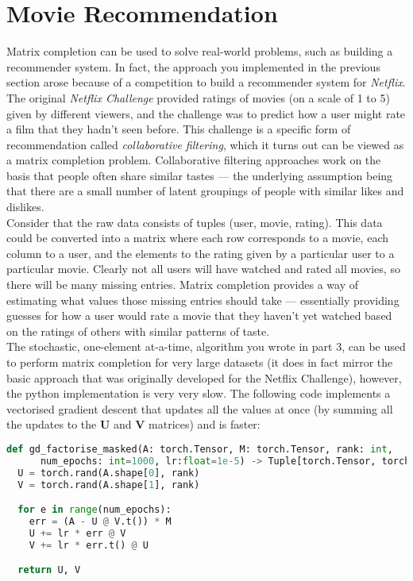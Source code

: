 \documentclass[a4paper]{article}
\begin{document}
\section{Movie Recommendation}
Matrix completion can be used to solve real-world problems, such as building a recommender system. In fact, the approach you implemented in the previous section arose because of a competition to build a recommender system for \emph{Netflix}. The original \emph{Netflix Challenge} provided ratings of movies (on a scale of 1 to 5) given by different viewers, and the challenge was to predict how a user might rate a film that they hadn't seen before. This challenge is a specific form of recommendation called \emph{collaborative filtering}, which it turns out can be viewed as a matrix completion problem. Collaborative filtering approaches work on the basis that people often share similar tastes --- the underlying assumption being that there are a small number of latent groupings of people with similar likes and dislikes.
\\[1em]
Consider that the raw data consists of tuples (user, movie, rating). This data could be converted into a matrix where each row corresponds to a movie, each column to a user, and the elements to the rating given by a particular user to a particular movie. Clearly not all users will have watched and rated all movies, so there will be many missing entries. Matrix completion provides a way of estimating what values those missing entries should take --- essentially providing guesses for how a user would rate a movie that they haven't yet watched based on the ratings of others with similar patterns of taste.
\\[1em]
The stochastic, one-element at-a-time, algorithm you wrote in part 3, can be used to perform matrix completion for very large datasets (it does in fact mirror the basic approach that was originally developed for the Netflix Challenge), however, the python implementation is very very slow. The following code implements a vectorised gradient descent that updates all the values at once (by summing all the updates to the $\bm U$ and $\bm V$ matrices) and is faster:

\begin{lstlisting}[language=Python]
def gd_factorise_masked(A: torch.Tensor, M: torch.Tensor, rank: int, 
      num_epochs: int=1000, lr:float=1e-5) -> Tuple[torch.Tensor, torch.Tensor]:
  U = torch.rand(A.shape[0], rank)
  V = torch.rand(A.shape[1], rank)

  for e in range(num_epochs):
    err = (A - U @ V.t()) * M
    U += lr * err @ V
    V += lr * err.t() @ U

  return U, V
\end{lstlisting}
\end{document}
